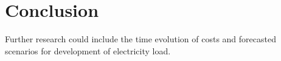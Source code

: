 
\section{Conclusion}
\label{sec:conclusion}

Further research could include the time evolution of costs and forecasted scenarios for development of electricity load.

